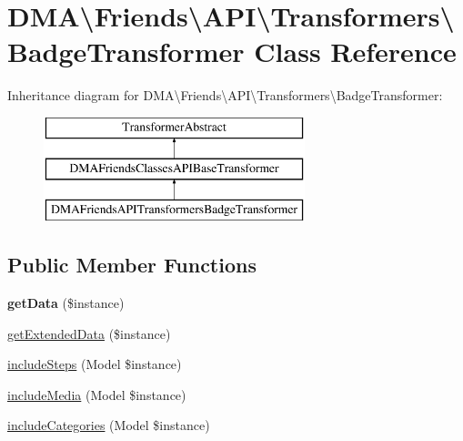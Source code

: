 \hypertarget{classDMA_1_1Friends_1_1API_1_1Transformers_1_1BadgeTransformer}{}\section{D\+M\+A\textbackslash{}Friends\textbackslash{}A\+P\+I\textbackslash{}Transformers\textbackslash{}Badge\+Transformer Class Reference}
\label{classDMA_1_1Friends_1_1API_1_1Transformers_1_1BadgeTransformer}
Inheritance diagram for D\+M\+A\textbackslash{}Friends\textbackslash{}A\+P\+I\textbackslash{}Transformers\textbackslash{}Badge\+Transformer\+:\begin{figure}[H]
\begin{center}
\leavevmode
\includegraphics[height=3.000000cm]{d7/d79/classDMA_1_1Friends_1_1API_1_1Transformers_1_1BadgeTransformer}
\end{center}
\end{figure}
\subsection*{Public Member Functions}
\begin{DoxyCompactItemize}
\item 
\hypertarget{classDMA_1_1Friends_1_1API_1_1Transformers_1_1BadgeTransformer_a08baf63a97cf8ce2e377162bcf6c00a5}{}{\bfseries get\+Data} (\$instance)\label{classDMA_1_1Friends_1_1API_1_1Transformers_1_1BadgeTransformer_a08baf63a97cf8ce2e377162bcf6c00a5}

\item 
\hyperlink{classDMA_1_1Friends_1_1API_1_1Transformers_1_1BadgeTransformer_a8687692fddb3b0c6b47bb1a2f4ac45ce}{get\+Extended\+Data} (\$instance)
\item 
\hyperlink{classDMA_1_1Friends_1_1API_1_1Transformers_1_1BadgeTransformer_af14a3d805e9bdd81d5c9e5e334ab3617}{include\+Steps} (Model \$instance)
\item 
\hyperlink{classDMA_1_1Friends_1_1API_1_1Transformers_1_1BadgeTransformer_aa3b6235d12b9c07bf3e3126b493a9885}{include\+Media} (Model \$instance)
\item 
\hyperlink{classDMA_1_1Friends_1_1API_1_1Transformers_1_1BadgeTransformer_aa4d31e1a597aa42ef473882961c7c149}{include\+Categories} (Model \$instance)
\end{DoxyCompactItemize}

